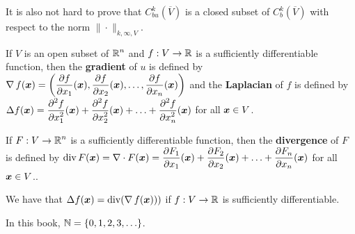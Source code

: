 It is also not hard to prove that
$\displaystyle C_{bu}^k(\overline{V})$ is a closed subset of
$\displaystyle C_b^k\left(\overline{V}\right)$ with respect to the
norm $\|\cdot\|_{k,\infty,V}$.

\begin{defn}
If $V$ is an open subset of $\displaystyle \mathbb{R}^n$ and $f:V \to \mathbb{R}$ is a
sufficiently differentiable function, then the
{\bfseries gradient} of $u$ is defined by
$\displaystyle \operatorname{\nabla} f({\bm{x}})
= \left( \frac{\partial{f}}{\partial x_1}({\bm{x}}) , \frac{\partial{f}}{\partial x_2}({\bm{x}}) ,
\ldots, \frac{\partial{f}}{\partial x_n}({\bm{x}}) \right)$ and the
{\bfseries Laplacian} of $f$ is defined by
$\displaystyle \Delta f({\bm{x}})
= \frac{\displaystyle \partial^{2}{f}} {\displaystyle \partial x_1^{2}}({\bm{x}}) + \frac{\displaystyle \partial^{2}{f}} {\displaystyle \partial x_2^{2}}({\bm{x}}) +
\ldots + \frac{\displaystyle \partial^{2}{f}} {\displaystyle \partial x_n^{2}}({\bm{x}})$ for all ${\bm{x}} \in V$.

If $\displaystyle F:V \to \mathbb{R}^n$ is a sufficiently differentiable
function, then the {\bfseries divergence} of $F$ is
defined by $\displaystyle \operatorname{div} F({\bm{x}}) = \nabla \cdot F({\bm{x}})
= \frac{\partial{F_1}}{\partial x_1}({\bm{x}}) + \frac{\partial{F_2}}{\partial x_2}({\bm{x}}) +
\ldots + \frac{\partial{F_n}}{\partial x_n}({\bm{x}})$ for all ${\bm{x}} \in V$..
\end{defn}

We have that $\Delta f({\bm{x}}) = \operatorname{div} (\operatorname{\nabla} f({\bm{x}})))$
if $f:V \to \mathbb{R}$ is sufficiently differentiable.

 In this book, $\mathbb{N} = \{0,1,2,3, \ldots\}$.

